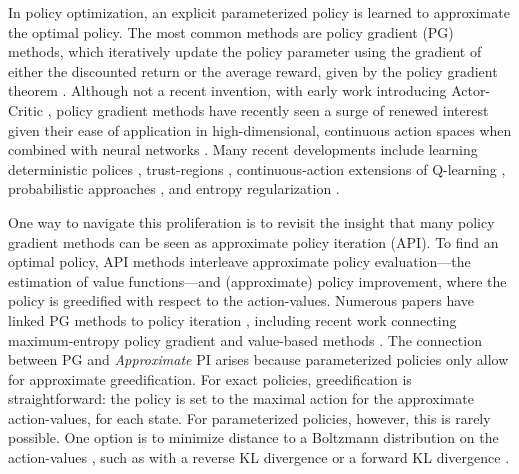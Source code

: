\documentclass[twoside,11pt]{article}
\begin{document}
In policy optimization, an explicit parameterized policy is learned to approximate the optimal policy. The most common methods are policy gradient (PG) methods, which iteratively update the policy parameter using the gradient of either the discounted return or the average reward, given by the {policy gradient theorem} \citep{sutton2000policy}.
Although not a recent invention, with early work introducing Actor-Critic \citep{sutton1984}, policy gradient methods have recently seen a surge of renewed interest given their ease of application in high-dimensional, continuous action spaces when combined with neural networks \citep{schulman2015high,wang2016sample}. Many recent developments include learning deterministic polices \citep{silver2014deterministic,lillicrap2015continuous}, trust-regions \citep{schulman2015trust,schulman2017proximal}, continuous-action extensions of Q-learning \citep{ haarnoja2017reinforcement,lim2018actor,ryu2019caql}, probabilistic approaches \citep{abdolmaleki2018maximum,fellows2019virel}, and entropy regularization \citep{haarnoja2017reinforcement, haarnoja2018soft}.

One way to navigate this proliferation is to revisit the insight that many policy gradient methods can be seen as approximate policy iteration (API). To find an optimal policy, API methods \citep{bertsekas2011approximate,scherrer2014approximate} interleave approximate policy evaluation---the estimation of value functions---and (approximate) policy improvement, where the policy is greedified with respect to the action-values. Numerous papers have linked PG methods to policy iteration \citep{sutton2000policy,kakade2002approximately,perkins2002existence,perkins2003convergent,wagner2011reinterpretation,wagner2013optimistic,scherrer2014local,bhandari2019global}, including recent work connecting maximum-entropy policy gradient and value-based methods \citep{o2016combining,nachum2017bridging, schulman2017equivalence, nachum2019algaedice}.
The connection between PG and \emph{Approximate} PI arises because parameterized policies only allow for approximate greedification. For exact policies, greedification is straightforward: the policy is set to the maximal action for the approximate action-values, for each state. 
For parameterized policies, however, this is rarely possible. One option is to minimize distance to a Boltzmann distribution on the action-values \citep{wagner2011reinterpretation}, such as with a reverse KL divergence \citep{haarnoja2018soft} or a forward KL divergence \citep{vieillard2019deep}.
\end{document}
